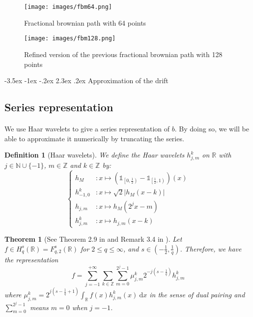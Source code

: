 \documentclass[11pt]{enstaPRE}
\makeatletter
\renewcommand\section{\@startsection {section}{1}{\z@}%
    {-3.5ex \@plus -1ex \@minus -.2ex}%
    {2.3ex \@plus.2ex}%
    {\centering\large\scshape\bfseries}}
\newtheorem{defi}{Definition}
\newtheorem{theo}{Theorem}
\newcommand{\R}{\mathbb{R}}
\newcommand{\Z}{\mathbb{Z}}
\newcommand{\N}{\mathbb{N}}
\newcommand{\di}{\mathrm{d}}
\makeatother
\begin{document}
\begin{figure}
    \centering
    \texttt{[image: images/fbm64.png]}
    \caption{\label{64} Fractional brownian path with 64 points}
\end{figure}

\begin{figure}
    \centering
    \texttt{[image: images/fbm128.png]}
    \caption{\label{128} Refined version of the previous fractional brownian path with 128 points}
\end{figure}

\section{Approximation of the drift}
\subsection{Series representation}
\paragraph{}
We use Haar wavelets to give a series representation of $b$. By doing so, we will be able to approximate it numerically by truncating the series.

\begin{defi}[Haar wavelets]
    We define the Haar wavelets $h_{j,m}^k$ on $\R$ with $j\in\N\cup\{-1\}$, $m\in\Z$ and $k\in\Z$ by:
    \begin{equation}
    \begin{cases}
    h_M&:x\longmapsto\left(\mathds{1}_{\left[0,\frac{1}{2}\right)}-\mathds{1}_{\left[\frac{1}{2},1\right)}\right)(x)\\ h_{-1,0}^k&:x\longmapsto\sqrt{2}\left|h_M(x-k)\right|\\
    h_{j,m}&:x\longmapsto h_M(2^jx-m)\\
    h_{j,m}^k&:x\longmapsto h_{j,m}(x-k)
    \end{cases}
    \end{equation}
\end{defi}

\begin{theo}[See Theorem 2.9 in \cite{Tri-bas} and Remark 3.4 in \cite{Tri-fab}]\label{haar}
    Let $f\in H^s_q(\R)=F^s_{q,2}(\R)$ for $2\leq q \leq \infty$, and $s\in\left(-\frac{1}{2},\frac{1}{q}\right)$. Therefore, we have the representation
    \begin{equation}
    f = \sum_{j=-1}^{+\infty}\sum_{k\in\Z}\sum_{m=0}^{2^j-1}\mu_{j,m}^k2^{-j\left(s-\frac{1}{q}\right)}h_{j,m}^k
    \end{equation}
    where $\mu_{j,m}^k = 2^{j\left(s-\frac{1}{q}+1\right)}\int_{\R}f(x)h_{j,m}^k(x)\ \di x$ in the sense of dual pairing and $\sum_{m=0}^{2^j-1}$ means $m=0$ when $j=-1$.
\end{theo}
\end{document}
